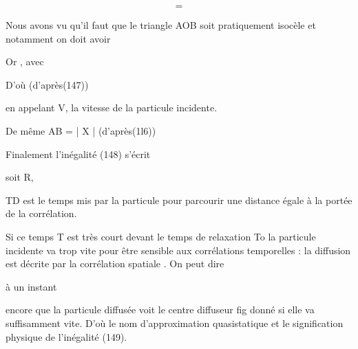 \[
\tag{149}=
\]

Nous avons vu qu'il faut que le triangle AOB soit pratiquement isocèle et
notamment on doit avoir

Or , avec 

D'où  (d'après(147))

en appelant V, la vitesse de la particule incidente.

De même AB = | X | (d'après(1l6))

Finalement l'inégalité (148) s'écrit

soit R,

TD est le temps mis par la particule pour parcourir une distance égale à la
portée de la corrélation.

Si ce temps T est très court devant le temps de relaxation To la particule
incidente va trop vite pour être sensible aux corrélations temporelles : la
diffusion est décrite par la corrélation spatiale . On peut dire

 à un instant

encore que la particule diffusée voit le centre diffuseur fig
donné si elle va suffisamment vite. D'où le nom d'approximation quasistatique
et le signification physique de l'inégalité (149).

